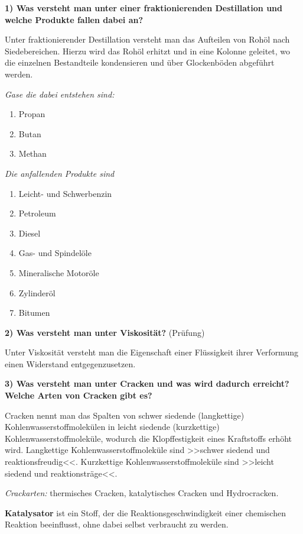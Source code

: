 \textbf{1) Was versteht man unter einer fraktionierenden Destillation
und welche Produkte fallen dabei an?}

Unter fraktionierender Destillation versteht man das Aufteilen von Rohöl
nach Siedebereichen. Hierzu wird das Rohöl erhitzt und in eine Kolonne
geleitet, wo die einzelnen Bestandteile kondensieren und über
Glockenböden abgeführt werden.

\emph{Gase die dabei entstehen sind:}

\begin{enumerate}
\item
  Propan
\item
  Butan
\item
  Methan
\end{enumerate}

\emph{Die anfallenden Produkte sind}

\begin{enumerate}
\item
  Leicht- und Schwerbenzin
\item
  Petroleum
\item
  Diesel
\item
  Gas- und Spindelöle
\item
  Mineralische Motoröle
\item
  Zylinderöl
\item
  Bitumen
\end{enumerate}

\textbf{2) Was versteht man unter Viskosität?} (Prüfung)

Unter Viskosität versteht man die Eigenschaft einer Flüssigkeit ihrer
Verformung einen Widerstand entgegenzusetzen.

\textbf{3) Was versteht man unter Cracken und was wird dadurch erreicht?
Welche Arten von Cracken gibt es?}

Cracken nennt man das Spalten von schwer siedende (langkettige)
Kohlenwasserstoffmolekülen in leicht siedende (kurzkettige)
Kohlenwasserstoffmoleküle, wodurch die Klopffestigkeit eines Kraftstoffs
erhöht wird. Langkettige Kohlenwasserstoffmoleküle sind >>schwer siedend
und reaktionsfreudig<<. Kurzkettige Kohlenwasserstoffmoleküle sind
>>leicht siedend und reaktionsträge<<.

\emph{Crackarten:} thermisches Cracken, katalytisches Cracken und
Hydrocracken.

\textbf{Katalysator} ist ein Stoff, der die Reaktionsgeschwindigkeit
einer chemischen Reaktion beeinflusst, ohne dabei selbst verbraucht zu
werden.

